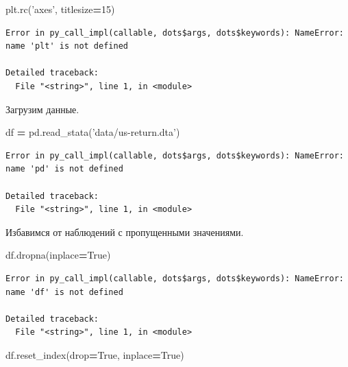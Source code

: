 \documentclass[]{book}
\newenvironment{Shaded}{\begin{snugshade}}{\end{snugshade}}
\newcommand{\DecValTok}[1]{\textcolor[rgb]{0.00,0.00,0.81}{#1}}
\newcommand{\NormalTok}[1]{#1}
\newcommand{\OperatorTok}[1]{\textcolor[rgb]{0.81,0.36,0.00}{\textbf{#1}}}
\newcommand{\StringTok}[1]{\textcolor[rgb]{0.31,0.60,0.02}{#1}}
\newcommand{\VariableTok}[1]{\textcolor[rgb]{0.00,0.00,0.00}{#1}}
\begin{document}
\begin{Shaded}
\begin{Highlighting}[]
\NormalTok{plt.rc(}\StringTok{'axes'}\NormalTok{, titlesize}\OperatorTok{=}\DecValTok{15}\NormalTok{)}
\end{Highlighting}
\end{Shaded}

\begin{verbatim}
Error in py_call_impl(callable, dots$args, dots$keywords): NameError: name 'plt' is not defined

Detailed traceback: 
  File "<string>", line 1, in <module>
\end{verbatim}

Загрузим данные.

\begin{Shaded}
\begin{Highlighting}[]
\NormalTok{df }\OperatorTok{=}\NormalTok{ pd.read_stata(}\StringTok{'data/us-return.dta'}\NormalTok{)}
\end{Highlighting}
\end{Shaded}

\begin{verbatim}
Error in py_call_impl(callable, dots$args, dots$keywords): NameError: name 'pd' is not defined

Detailed traceback: 
  File "<string>", line 1, in <module>
\end{verbatim}

Избавимся от наблюдений с пропущенными значениями.

\begin{Shaded}
\begin{Highlighting}[]
\NormalTok{df.dropna(inplace}\OperatorTok{=}\VariableTok{True}\NormalTok{)}
\end{Highlighting}
\end{Shaded}

\begin{verbatim}
Error in py_call_impl(callable, dots$args, dots$keywords): NameError: name 'df' is not defined

Detailed traceback: 
  File "<string>", line 1, in <module>
\end{verbatim}

\begin{Shaded}
\begin{Highlighting}[]
\NormalTok{df.reset_index(drop}\OperatorTok{=}\VariableTok{True}\NormalTok{, inplace}\OperatorTok{=}\VariableTok{True}\NormalTok{)}
\end{Highlighting}
\end{Shaded}
\end{document}
